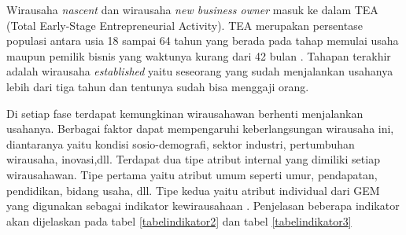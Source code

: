 Wirausaha \textit{nascent} dan wirausaha \textit{new business owner} masuk ke dalam TEA (Total Early-Stage Entrepreneurial Activity). TEA merupakan persentase populasi antara usia 18 sampai 64 tahun yang berada pada tahap memulai usaha maupun pemilik bisnis yang waktunya kurang dari 42 bulan \cite{GEM2017}. Tahapan terakhir adalah wirausaha \textit{established} yaitu seseorang yang sudah menjalankan usahanya lebih dari tiga tahun dan tentunya sudah bisa menggaji orang.\cite{GEM2013}

Di setiap fase terdapat kemungkinan wirausahawan berhenti menjalankan usahanya. Berbagai faktor dapat mempengaruhi keberlangsungan wirausaha ini, diantaranya yaitu kondisi sosio-demografi, sektor industri, pertumbuhan wirausaha, inovasi,dll. Terdapat dua tipe atribut internal yang dimiliki setiap wirausahawan. Tipe pertama yaitu atribut umum seperti umur, pendapatan, pendidikan, bidang usaha, dll. Tipe kedua yaitu atribut individual dari GEM yang digunakan sebagai indikator kewirausahaan \cite{ECA}. Penjelasan beberapa indikator akan dijelaskan pada tabel \ref{tabelindikator2} dan tabel \ref{tabelindikator3}


